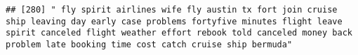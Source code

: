 \documentclass[
]{article}
\begin{document}
\begin{verbatim}
## [280] " fly spirit airlines wife fly austin tx fort join cruise ship leaving day early case problems fortyfive minutes flight leave spirit canceled flight weather effort rebook told canceled money back problem late booking time cost catch cruise ship bermuda"                                                                                                                                                                                                                                                                                                                                                                                                                                                                                                                                                                                                                                                                                                                                                                                                                                                                                                                                                                                                                                                                                                                                                                                                                                                                                                                                                                                                                                                                                                                                   

\end{verbatim}
\end{document}
